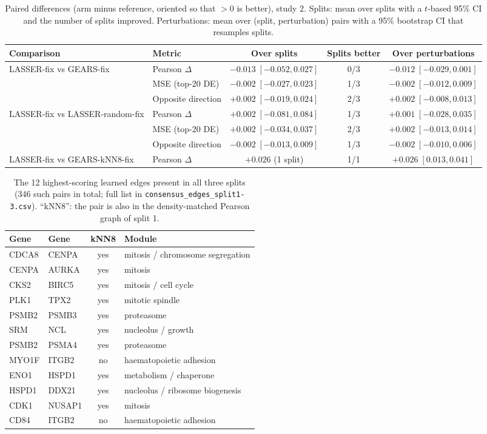 \documentclass[11pt]{article}
\begin{document}
\begin{table}[t]
\centering
\caption{Paired differences (arm minus reference, oriented so that $>0$ is better), study 2.
Splits: mean over splits with a $t$-based 95\% CI and the number of splits improved.
Perturbations: mean over (split, perturbation) pairs with a 95\% bootstrap CI that resamples splits.}
\label{tab:paired}
\small
\begin{tabular}{llccc}
\toprule
Comparison & Metric & Over splits & Splits better & Over perturbations\\
\midrule
LASSER-fix vs GEARS-fix & Pearson $\Delta$ & $-0.013\;[-0.052, 0.027]$ & 0/3 & $-0.012\;[-0.029, 0.001]$\\
 & MSE (top-20 DE) & $-0.002\;[-0.027, 0.023]$ & 1/3 & $-0.002\;[-0.012, 0.009]$\\
 & Opposite direction & $+0.002\;[-0.019, 0.024]$ & 2/3 & $+0.002\;[-0.008, 0.013]$\\
LASSER-fix vs LASSER-random-fix & Pearson $\Delta$ & $+0.002\;[-0.081, 0.084]$ & 1/3 & $+0.001\;[-0.028, 0.035]$\\
 & MSE (top-20 DE) & $+0.002\;[-0.034, 0.037]$ & 2/3 & $+0.002\;[-0.013, 0.014]$\\
 & Opposite direction & $-0.002\;[-0.013, 0.009]$ & 1/3 & $-0.002\;[-0.010, 0.006]$\\
LASSER-fix vs GEARS-kNN8-fix & Pearson $\Delta$ & $+0.026$ (1 split) & 1/1 & $+0.026\;[0.013, 0.041]$\\
\bottomrule
\end{tabular}
\end{table}

\begin{table}[t]
\centering
\caption{The 12 highest-scoring learned edges present in all three splits (346 such pairs in total; full list in
\texttt{consensus\_edges\_split1-3.csv}). ``kNN8'': the pair is also in the density-matched Pearson graph of split 1.}
\label{tab:consensus}
\small
\begin{tabular}{llcl}
\toprule
Gene & Gene & kNN8 & Module\\
\midrule
CDCA8 & CENPA & yes & mitosis / chromosome segregation\\
CENPA & AURKA & yes & mitosis\\
CKS2 & BIRC5 & yes & mitosis / cell cycle\\
PLK1 & TPX2 & yes & mitotic spindle\\
PSMB2 & PSMB3 & yes & proteasome\\
SRM & NCL & yes & nucleolus / growth\\
PSMB2 & PSMA4 & yes & proteasome\\
MYO1F & ITGB2 & no & haematopoietic adhesion\\
ENO1 & HSPD1 & yes & metabolism / chaperone\\
HSPD1 & DDX21 & yes & nucleolus / ribosome biogenesis\\
CDK1 & NUSAP1 & yes & mitosis\\
CD84 & ITGB2 & no & haematopoietic adhesion\\
\bottomrule
\end{tabular}
\end{table}
\end{document}
